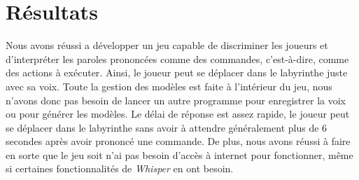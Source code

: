 \section{Résultats}
\label{sec:resultats}

Nous avons réussi a développer un jeu capable de discriminer les joueurs et d'interpréter les paroles prononcées comme des commandes, c'est-à-dire, comme des
actions à exécuter. Ainsi, le joueur peut se déplacer dans le labyrinthe juste avec sa voix. Toute la gestion des modèles est faite à l'intérieur du jeu, nous
n'avons donc pas besoin de lancer un autre programme pour enregistrer la voix ou pour générer les modèles. Le délai de réponse est assez rapide, le joueur
peut se déplacer dans le labyrinthe sans avoir à attendre généralement plus de 6 secondes après avoir prononcé une commande. De plus, nous avons réussi à faire
en sorte que le jeu soit n'ai pas besoin d'accès à internet pour fonctionner, même si certaines fonctionnalités de \textit{Whisper} en ont besoin.

